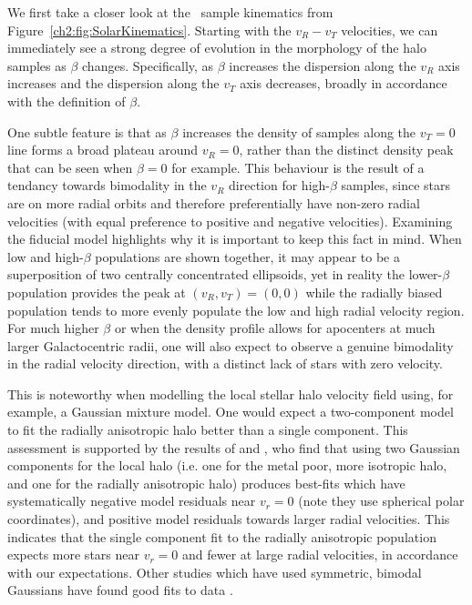 We first take a closer look at the \solar\ sample kinematics from Figure~\ref{ch2:fig:SolarKinematics}. Starting with the $v_{R}-v_{T}$ velocities, we can immediately see a strong degree of evolution in the morphology of the halo samples as $\beta$ changes. Specifically, as $\beta$ increases the dispersion along the $v_{R}$ axis increases and the dispersion along the $v_{T}$ axis decreases, broadly in accordance with the definition of $\beta$. 

One subtle feature is that as $\beta$ increases the density of samples along the $v_{T}=0$ line forms a broad plateau around $v_{R}=0$, rather than the distinct density peak that can be seen when $\beta=0$ for example. This behaviour is the result of a tendancy towards bimodality in the $v_{R}$ direction for high-$\beta$ samples, since stars are on more radial orbits and therefore preferentially have non-zero radial velocities (with equal preference to positive and negative velocities). Examining the fiducial model highlights why it is important to keep this fact in mind. When low and high-$\beta$ populations are shown together, it may appear to be a superposition of two centrally concentrated ellipsoids, yet in reality the lower-$\beta$ population provides the peak at $(v_{R},v_{T}) = (0,0)$ while the radially biased population tends to more evenly populate the low and high radial velocity region. For much higher $\beta$ or when the density profile allows for apocenters at much larger Galactocentric radii, one will also expect to observe a genuine bimodality in the radial velocity direction, with a distinct lack of stars with zero velocity. 

This is noteworthy when modelling the local stellar halo velocity field using, for example, a Gaussian mixture model. One would expect a two-component model to fit the radially anisotropic halo better than a single component. This assessment is supported by the results of \textcite{belokurov18} and \textcite{fattahi19}, who find that using two Gaussian components for the local halo (i.e. one for the metal poor, more isotropic halo, and one for the radially anisotropic halo) produces best-fits which have systematically negative model residuals near $v_{r}=0$ (note they use spherical polar coordinates), and positive model residuals towards larger radial velocities. This indicates that the single component fit to the radially anisotropic population expects more stars near $v_{r}=0$ and fewer at large radial velocities, in accordance with our expectations. Other studies which have used symmetric, bimodal Gaussians have found good fits to data \parencite{lancaster19,necib19}.

